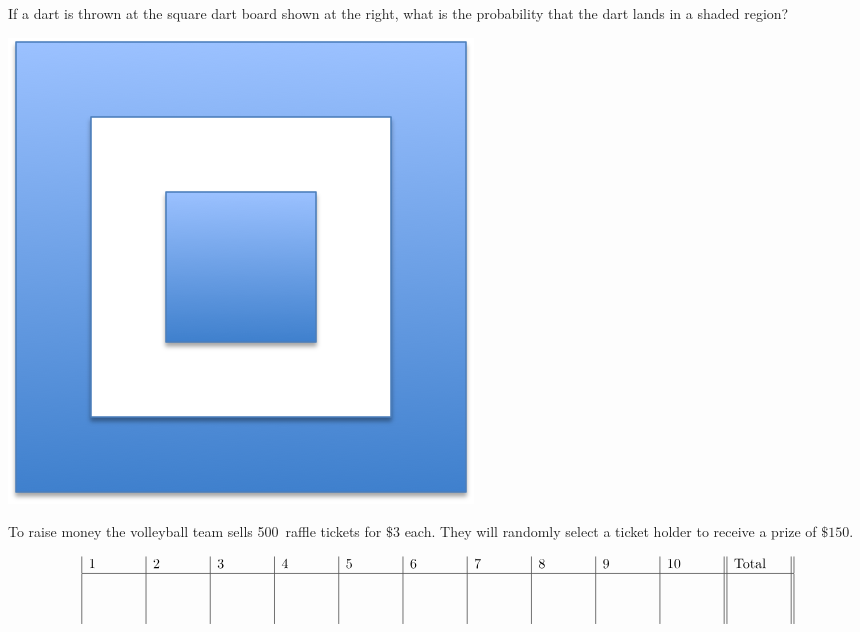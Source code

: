 \documentclass[addpoints,12pt]{exam}
\begin{document}
\begin{questions}
\question[10]
\begin{multicols}{2}
If a dart is thrown at the square dart board shown at the right,
what is the probability that the dart lands in a shaded region?\\
\begin{center}\includegraphics[scale=.5]{Dart}\end{center}
\end{multicols}
\vspace{1in}

\question[10] To raise money the volleyball team sells 500~raffle tickets
for $\$3$ each. They will randomly select a ticket holder to receive
a prize of $\$150$.

\end{questions}

\vfill
\[\begin{array}
{|p{.5in}|p{.5in}|p{.5in}|p{.5in}|p{.5in}|p{.5in}|p{.5in}|p{.5in}|p{.5in}|p{.5in}||p{.5in}||}
1&2&3&4&5&6&7&8&9&10&\text{Total}\\\hline
\vspace{.5in}&&&&&&&&&&
\end{array}\]
\end{document}
